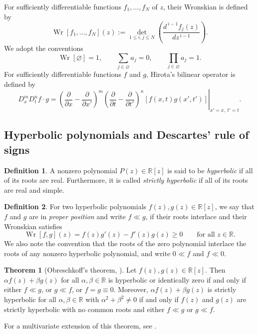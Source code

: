 \documentclass[preprint,3p,10pt]{elsarticle}
\newcommand{\R}{\mathbb R}
\theoremstyle{definition}
\newtheorem{definition}{Definition}[section]
\newtheorem{theorem}{Theorem}[section]
\begin{document}
For sufficiently differentiable functions
\(f_1,\ldots,f_N\) of \(z\), their Wronskian is defined by
\begin{equation*}
    \operatorname{Wr}[f_1,\ldots,f_N](z)
    :=
    \det_{1\le i,j\le N}\left(
        \frac{d^{\,i-1}f_j(z)}{dz^{\,i-1}}
    \right).
\end{equation*}
We adopt the conventions
\begin{equation*}
    \operatorname{Wr}[\varnothing]=1,
    \qquad
    \sum_{j\in\varnothing}a_j=0,
    \qquad
    \prod_{j\in\varnothing}a_j=1.
\end{equation*}
For sufficiently differentiable functions \(f\) and \(g\),
Hirota's bilinear operator is defined by
\cite{hirota2004direct}
\begin{equation}
D_x^m D_t^n f\cdot g
=
\left.
\left(
\frac{\partial}{\partial x}
-
\frac{\partial}{\partial x'}
\right)^m
\left(
\frac{\partial}{\partial t}
-
\frac{\partial}{\partial t'}
\right)^n
\left[
f(x,t)g(x',t')
\right]
\right|_{x'=x,\;t'=t}.
\end{equation}

\subsection{Hyperbolic polynomials and Descartes' rule of signs}

\begin{definition}\label{def:hyperbolic}
A nonzero polynomial $P(z) \in \mathbb{R}[z]$ is said to be \emph{hyperbolic} if all of its roots are real. Furthermore, it is called \emph{strictly hyperbolic} if all of its roots are real and simple.
\end{definition}

\begin{definition}\label{def:proper-position}
For two hyperbolic polynomials $f(z), g(z) \in \mathbb{R}[z]$, we say that $f$ and $g$ are in \emph{proper position} and write $f \ll g$, if their roots interlace and their Wronskian satisfies
\begin{equation}
    \operatorname{Wr}[f,g](z) = f(z)g'(z) - f'(z)g(z) \ge 0 \qquad \text{for all } z \in \mathbb{R}.
\end{equation}
We also note the convention that the roots of the zero polynomial interlace the
roots of any nonzero hyperbolic polynomial, and write \(0\ll f\) and \(f\ll0\).
\end{definition}

\begin{theorem}[Obreschkoff's theorem, {\cite{obreschkoff1963verteilung,borcea2009polya}}]\label{thm:obreschkoff}
Let \(f(z),g(z)\in\R[z]\).  Then 
\(\alpha f(z)+\beta g(z)\) for all \(\alpha,\beta\in\R\) is hyperbolic or identically zero
if and only if either \(f\ll g\), or \(g\ll f\), or \(f=g\equiv0\).
Moreover, \(\alpha f(z)+\beta g(z)\) is strictly hyperbolic for all \(\alpha,\beta\in\R\) with  \(\alpha^2+\beta^2\not=0\) if and
only if \(f(z)\) and \(g(z)\) are strictly hyperbolic with no common roots and
either \(f\ll g\) or \(g\ll f\).
\end{theorem}
For a multivariate extension of this theorem, see  \cite[Theorem~2.9]{borcea2009lee}.
\end{document}
